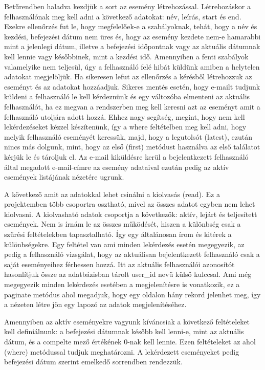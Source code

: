 \documentclass[
]{thesis-ekf}
\theoremstyle{definition}
\theoremstyle{remark}
\begin{document}
	Betűrendben haladva kezdjük a sort az esemény létrehozással. Létrehozáskor a felhasználónak meg kell adni a következő adatokat: név, leírás, start és end. Ezekre ellenőrzés fut le, hogy megfelelőek-e a szabályoknak, tehát, hogy a név és kezdési, befejezési dátum nem üres és, hogy az esemény kezdete nem-e hamarabbi mint a jelenlegi dátum, illetve a befejezési időpontnak vagy az aktuális dátumnak kell lennie vagy későbbinek, mint a kezdési idő. Amennyiben a fenti szabályok valamelyike nem teljesül, úgy a felhasználó felé hibát küldünk amiben a helytelen adatokat megjelöljük. Ha sikeresen lefut az ellenőrzés a kérésből létrehozzuk az eseményt és az adatokat hozzáadjuk. Sikeres mentés esetén, hogy e-mailt tudjunk küldeni a felhasználó le kell kérdeznünk és egy változóba elmenteni az aktuális felhasználót, ha ez megvan a rendszerben meg kell keresni azt az eseményt amit a felhasználó utoljára adott hozzá. Ehhez nagy segítség, megint, hogy nem kell lekérdezéseket kézzel készítenünk, így a where feltételben meg kell adni, hogy melyik felhasználó eseményét keressük, majd, hogy a legutolsót (latest), ezután nincs más dolgunk, mint, hogy az első (first) metódust használva az első találatot kérjük le és tároljuk el. Az e-mail kiküldésre kerül a bejelentkezett felhasználó által megadott e-mail-címre az esemény adataival ezután pedig az aktív események listájának nézetére ugrunk.
	
	A következő amit az adatokkal lehet csinálni a kiolvasás (read). Ez a projektemben több csoportra osztható, mivel az összes adatot egyben nem lehet kiolvasni. A kiolvasható adatok csoportja a következők: aktív, lejárt és teljesített események. Nem is írnám le az összes működését, hiszen a különbség csak a szűrési feltételekben tapasztalható. Így egy általánosan írom és kitérek a különbségekre. Egy feltétel van ami minden lekérdezés esetén megegyezik, az pedig a felhasználó vizsgálat, hogy az aktuálisan bejelentkezett felhasználó csak a saját eseményeihez férhessen hozzá. Itt az aktuális felhasználói azonosítót hasonlítjuk össze az adatbázisban tárolt user\_id nevű külső kulccsal. Ami még megegyezik minden lekérdezés esetében a megjelenítésre is vonatkozik, ez a paginate metódus ahol megadjuk, hogy egy oldalon hány rekord jelenhet meg, így a nézeten létre jön egy lapozó az adatok megjelenítéséhez.
	
	Amennyiben az aktív eseményekre vagyunk kíváncsiak a következő feltételeket kell definiálnunk: a befejezési dátumnak később kell lenni-e, mint az aktuális dátum, és a compelte mező értékének 0-nak kell lennie. Ezen feltételeket az ahol (where) metódussal tudjuk meghatározni. A lekérdezett eseményeket pedig befejezési dátum szerint emelkedő sorrendben rendezzük.
	
\end{document}
